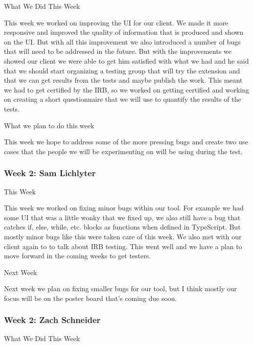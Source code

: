 What We Did This Week



This week we worked on improving the UI for our client. We made it more responsive and improved the quality of information that is produced and shown on the UI. But with all this improvement we also introduced a number of bugs that will need to be addressed in the future. But with the improvements we showed our client we were able to get him satisfied with what we had and he said that we should start organizing a testing group that will try the extension and that we can get results from the tests and maybe publish the work. This meant we had to get certified by the IRB, so we worked on getting certified and working on creating a short questionnaire that we will use to quantify the results of the tests.



What we plan to do this week



This week we hope to address some of the more pressing bugs and create two use cases that the people we will be experimenting on will be using during the test.  \\ 

 \subsubsection{Week 2: Sam Lichlyter}

This Week 

This week we worked on fixing minor bugs within our tool. For example we had some UI that was a little wonky that we fixed up, we also still have a bug that catches if, else, while, etc. blocks as functions when defined in TypeScript. But mostly minor bugs like this were taken care of this week. We also met with our client again to to talk about IRB testing. This went well and we have a plan to move forward in the coming weeks to get testers.



Next Week

Next week we plan on fixing smaller bugs for our tool, but I think mostly our focus will be on the poster board that's coming due soon. \\ 

 \subsubsection{Week 2: Zach Schneider}

What We Did This Week

